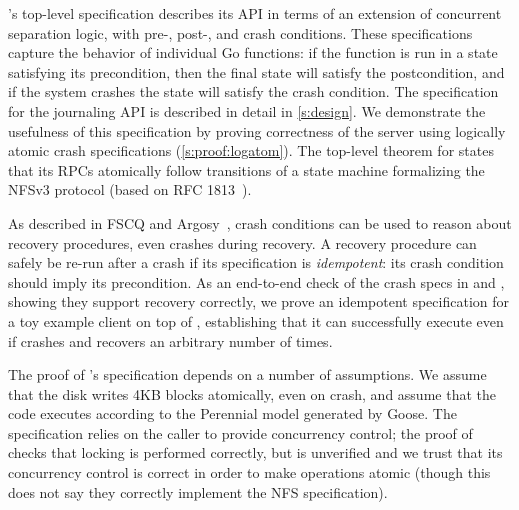 \txn's top-level specification describes its API in terms of an extension of
concurrent separation logic, with pre-, post-, and crash conditions. These
specifications capture the behavior of individual Go functions: if the function
is run in a state satisfying its precondition, then the final state will satisfy
the postcondition, and if the system crashes the state will satisfy the crash
condition. The specification for the journaling API is described in detail in \cref{s:design}. We
demonstrate the usefulness of this specification by proving correctness of the \simplenfs
server using logically atomic crash specifications (\cref{s:proof:logatom}). %
The top-level theorem for \simplenfs states that its RPCs
atomically follow transitions of a state machine formalizing the NFSv3 protocol (based on RFC
1813~\cite{RFC:1813}).

As described in FSCQ and Argosy~\cite{chen:fscq,chajed:argosy}, crash conditions
can be used to reason about recovery procedures, even crashes during recovery. A
recovery procedure can safely be re-run after a crash if its specification is
\emph{idempotent}: its crash condition should imply its precondition. As an
end-to-end check of the crash specs in \simplenfs and \txn, showing they support
recovery correctly, we prove an idempotent specification for a toy example
client on top of \simplenfs, establishing that it can successfully execute even if
\simplenfs crashes and recovers an arbitrary number of times.

The proof of \txn's specification depends on a number of assumptions. We assume
that the disk writes 4KB blocks atomically, even on crash, and assume that the
code executes according to the Perennial model generated by Goose. The
specification relies on the caller to provide concurrency control; the proof of
\simplenfs checks that locking is performed correctly, but \gnfs is unverified
and we trust that its concurrency control is correct in order to make operations
atomic (though this does not say they correctly implement the NFS
specification).


